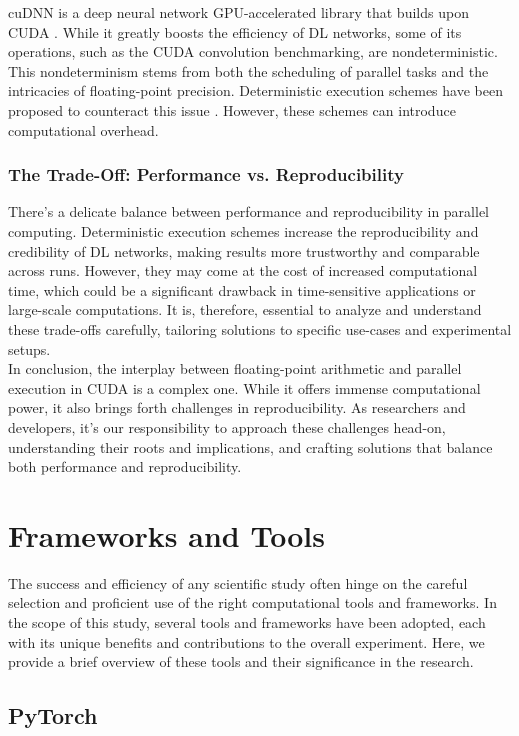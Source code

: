 cuDNN is a deep neural network GPU-accelerated library that builds upon CUDA \cite{chetlur2014cudnn}. While it greatly boosts the efficiency of DL networks, some of its operations, such as the CUDA convolution benchmarking, are nondeterministic. This nondeterminism stems from both the scheduling of parallel tasks and the intricacies of floating-point precision. Deterministic execution schemes have been proposed to counteract this issue \cite{chou2020deterministic}. However, these schemes can introduce computational overhead.

\subsubsection*{The Trade-Off: Performance vs. Reproducibility}

There's a delicate balance between performance and reproducibility in parallel computing. Deterministic execution schemes increase the reproducibility and credibility of DL networks, making results more trustworthy and comparable across runs. However, they may come at the cost of increased computational time, which could be a significant drawback in time-sensitive applications or large-scale computations. It is, therefore, essential to analyze and understand these trade-offs carefully, tailoring solutions to specific use-cases and experimental setups.\\

In conclusion, the interplay between floating-point arithmetic and parallel execution in CUDA is a complex one. While it offers immense computational power, it also brings forth challenges in reproducibility. As researchers and developers, it's our responsibility to approach these challenges head-on, understanding their roots and implications, and crafting solutions that balance both performance and reproducibility.

\section{Frameworks and Tools}
The success and efficiency of any scientific study often hinge on the careful selection and proficient use of the right computational tools and frameworks. In the scope of this study, several tools and frameworks have been adopted, each with its unique benefits and contributions to the overall experiment. Here, we provide a brief overview of these tools and their significance in the research.

\subsection{PyTorch}

